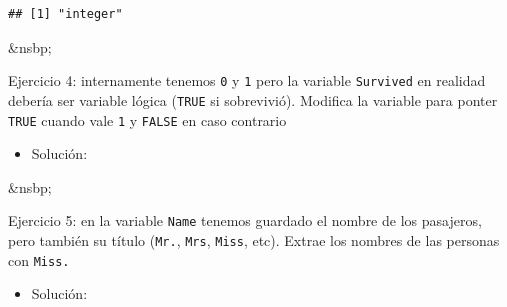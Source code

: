 \documentclass[11pt,]{book}
\newenvironment{Shaded}{\begin{snugshade}}{\end{snugshade}}
\newcommand{\CommentTok}[1]{\textcolor[rgb]{0.37,0.37,0.37}{\textit{#1}}}
\newcommand{\ControlFlowTok}[1]{\textcolor[rgb]{0.27,0.27,0.27}{\textbf{#1}}}
\newcommand{\DecValTok}[1]{\textcolor[rgb]{0.06,0.06,0.06}{#1}}
\newcommand{\KeywordTok}[1]{\textcolor[rgb]{0.27,0.27,0.27}{\textbf{#1}}}
\newcommand{\NormalTok}[1]{#1}
\newcommand{\OperatorTok}[1]{\textcolor[rgb]{0.43,0.43,0.43}{\textbf{#1}}}
\newcommand{\OtherTok}[1]{\textcolor[rgb]{0.37,0.37,0.37}{#1}}
\newcommand{\StringTok}[1]{\textcolor[rgb]{0.5,0.5,0.5}{#1}}
\providecommand{\tightlist}{%
  \setlength{\itemsep}{0pt}\setlength{\parskip}{0pt}}
\begin{document}
\begin{verbatim}
## [1] "integer"
\end{verbatim}

\&nsbp;

Ejercicio 4: internamente tenemos \texttt{0} y \texttt{1} pero la variable \texttt{Survived} en realidad debería ser variable lógica (\texttt{TRUE} si sobrevivió). Modifica la variable para ponter \texttt{TRUE} cuando vale \texttt{1} y \texttt{FALSE} en caso contrario

\begin{itemize}
\tightlist
\item
  Solución:
\end{itemize}

\begin{Shaded}
\end{Shaded}

\&nsbp;

Ejercicio 5: en la variable \texttt{Name} tenemos guardado el nombre de los pasajeros, pero también su título (\texttt{Mr.}, \texttt{Mrs}, \texttt{Miss}, etc). Extrae los nombres de las personas con \texttt{Miss.}

\begin{itemize}
\tightlist
\item
  Solución:
\end{itemize}
\end{document}
